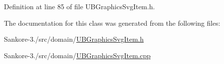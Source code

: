 Definition at line 85 of file U\-B\-Graphics\-Svg\-Item.\-h.



The documentation for this class was generated from the following files\-:\begin{DoxyCompactItemize}
\item 
Sankore-\/3./src/domain/\hyperlink{_u_b_graphics_svg_item_8h}{U\-B\-Graphics\-Svg\-Item.\-h}\item 
Sankore-\/3./src/domain/\hyperlink{_u_b_graphics_svg_item_8cpp}{U\-B\-Graphics\-Svg\-Item.\-cpp}\end{DoxyCompactItemize}

